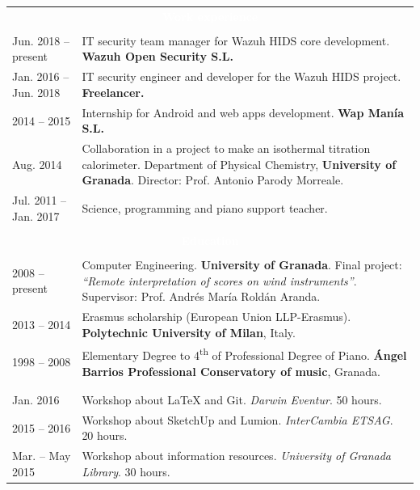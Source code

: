 \documentclass[12pt,a4paper]{article}
\newcommand{\header}[1]{\multicolumn{2}{c}{\cellcolor{black} \textcolor{white} {\bfseries #1}} \\ \\[-12pt]}
\begin{document}
	\begin{longtable}{p{} p{}}
		\header{Work experience}
		Jun. 2018 -- present & IT security team manager for Wazuh HIDS core development. \newline
		\textbf{Wazuh Open Security S.L.} \\
		Jan. 2016 -- Jun. 2018 & IT security engineer and developer for the Wazuh HIDS project. \newline
		\textbf{Freelancer.} \\
		2014 -- 2015 & Internship for Android and web apps development. \newline
		\textbf{Wap Manía S.L.}\\
		Aug. 2014 & Collaboration in a project to make an isothermal titration
		calorimeter. \newline
		Department of Physical Chemistry, \textbf{University of Granada}. \newline
		Director: Prof. Antonio Parody Morreale. \\
		Jul. 2011 -- Jan. 2017 & Science, programming and piano support teacher. \\
		\\
		\header{Education}
		2008 -- present & Computer Engineering. \textbf{University of Granada}. \newline
		Final project: \textit{``Remote interpretation of scores on wind
		instruments''}. \newline
		Supervisor: Prof. Andrés María Roldán Aranda. \\
		2013 -- 2014 & Erasmus scholarship (European Union LLP-Erasmus). \newline
		\textbf{Polytechnic University of Milan}, Italy. \\
		1998 -- 2008 & Elementary Degree to 4\textsuperscript{th} of Professional
		Degree of Piano. \newline
		\textbf{Ángel Barrios Professional Conservatory of music}, Granada. \\
		\newpage
		\header{Courses and events}
		Jan. 2016 & Workshop about LaTeX and Git. \newline
		\textit{Darwin Eventur}. 50 hours. \\
		2015 -- 2016 & Workshop about SketchUp and Lumion. \newline
		\textit{InterCambia ETSAG}. 20 hours. \\
		Mar. -- May 2015 & Workshop about information resources. \newline
		\textit{University of Granada Library}. 30 hours. \\

\end{longtable}
\end{document}
